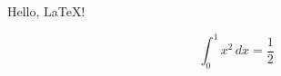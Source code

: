 \documentclass{article}
\begin{document}
Hello, \LaTeX!

\[
    \int_0^1 x^2\,dx = \frac{1}{2}
\]
\end{document}
